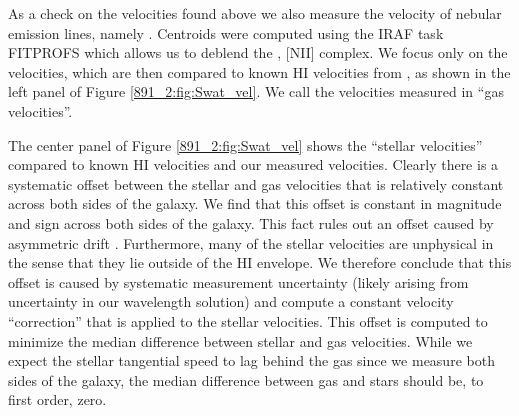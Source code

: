 As a check on the velocities found above we also measure the velocity
of nebular emission lines, namely \Ha. Centroids were computed using
the IRAF task FITPROFS which allows us to deblend the \Ha, [NII]
complex. We focus only on the \Ha velocities, which are then compared
to known HI velocities from \citet{Swaters97}, as shown in the left
panel of Figure \ref{891_2:fig:Swat_vel}. We call the velocities measured in
\Ha ``gas velocities''.


The center panel of Figure \ref{891_2:fig:Swat_vel} shows the ``stellar
velocities'' compared to known HI velocities and our measured \Ha
velocities. Clearly there is a systematic offset between the stellar
and gas velocities that is relatively constant across both sides of
the galaxy. We find that this offset is constant in magnitude and sign
across both sides of the galaxy. This fact rules out an offset caused
by asymmetric drift \citep{Binney87}. Furthermore, many of the stellar
velocities are unphysical in the sense that they lie outside of the HI
envelope. We therefore conclude that this offset is caused by
systematic measurement uncertainty (likely arising from uncertainty in
our wavelength solution) and compute a constant velocity ``correction''
that is applied to the stellar velocities. This offset is computed to
minimize the median difference between stellar and gas
velocities. While we expect the stellar tangential speed to lag behind
the gas since we measure both sides of the galaxy, the median
difference between gas and stars should be, to first order, zero.


